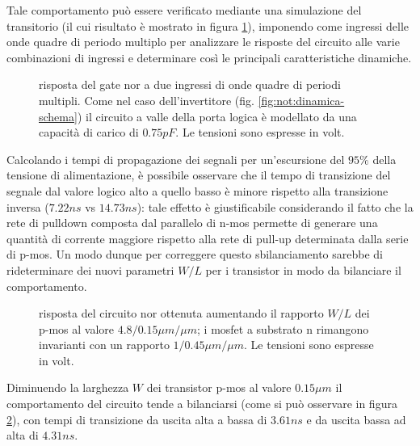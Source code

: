 	Tale comportamento può essere verificato mediante una simulazione del transitorio (il cui risultato è mostrato in figura \ref{fig:nor:dinamica}), imponendo come ingressi delle onde quadre di periodo multiplo per analizzare le risposte del circuito alle varie combinazioni di ingressi e determinare così le principali caratteristiche dinamiche.
	
	\begin{figure}[bht]
		\centering
		
		\caption{risposta del gate nor a due ingressi di onde quadre di periodi multipli. Come nel caso dell'invertitore (fig. \ref{fig:not:dinamica-schema}) il circuito a valle della porta logica è modellato da una capacità di carico di $0.75pF$.  Le tensioni sono espresse in volt.}
		\label{fig:nor:dinamica}
	\end{figure}

	Calcolando i tempi di propagazione dei segnali per un'escursione del $95\%$ della tensione di alimentazione, è possibile osservare che il tempo di transizione del segnale dal valore logico alto a quello basso è minore rispetto alla transizione inversa ($7.22ns$ vs $14.73 ns$): tale effetto è giustificabile considerando il fatto che la rete di pulldown composta dal parallelo di n-mos permette di generare una quantità di corrente maggiore rispetto alla rete di pull-up determinata dalla serie di p-mos. Un modo dunque per correggere questo sbilanciamento sarebbe di rideterminare dei nuovi parametri $W/L$ per i transistor in modo da bilanciare il comportamento.
	
	\begin{figure}[H]
		\centering
		
		\vspace{3.5mm}
		\caption{risposta del circuito nor ottenuta aumentando il rapporto $W/L$ dei p-mos al valore $4.8/0.15 \mu m/\mu m$; i mosfet a substrato n rimangono invarianti con un rapporto $1/0.45\mu m/\mu m$.  Le tensioni sono espresse in volt.}
		\label{fig:nor:dinamica-corretta}
	\end{figure}
	
	Diminuendo la larghezza $W$ dei transistor p-mos al valore $0.15\mu m$ il comportamento del circuito tende a bilanciarsi (come si può osservare in figura \ref{fig:nor:dinamica-corretta}), con tempi di transizione da uscita alta a bassa di $3.61ns$ e da uscita bassa ad alta di $4.31ns$. 
	
